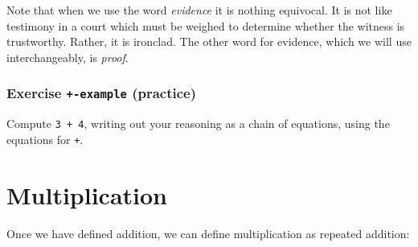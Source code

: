 Note that when we use the word \emph{evidence} it is nothing equivocal.
It is not like testimony in a court which must be weighed to determine
whether the witness is trustworthy. Rather, it is ironclad. The other
word for evidence, which we will use interchangeably, is \emph{proof}.

\hypertarget{Naturals-plus-example}{%
\subsubsection{\texorpdfstring{Exercise \texttt{+-example}
(practice)}{Exercise +-example (practice)}}\label{Naturals-plus-example}}

Compute \texttt{3\ +\ 4}, writing out your reasoning as a chain of
equations, using the equations for \texttt{+}.

\begin{fence}
\begin{code}%
\>[0]\<%
\end{code}
\end{fence}

\hypertarget{multiplication}{%
\section{Multiplication}\label{multiplication}}

Once we have defined addition, we can define multiplication as repeated
addition:

\begin{fence}
\begin{code}%
\>[0]\AgdaOperator{\AgdaFunction{\AgdaUnderscore{}*\AgdaUnderscore{}}}\AgdaSpace{}%
\AgdaSymbol{:}\AgdaSpace{}%
\AgdaSpace{}%
\AgdaSpace{}%
\AgdaSpace{}%
\AgdaSpace{}%
\<%
\\
\>[0]%
\>[8]\AgdaOperator{\AgdaFunction{*}}\AgdaSpace{}%
%
\>[13]\AgdaSymbol{=}%
\>[16]\<%
\\
\>[0]\AgdaSymbol{(}\AgdaSpace{}%
\AgdaSymbol{)}\AgdaSpace{}%
\AgdaOperator{\AgdaFunction{*}}\AgdaSpace{}%
%
\>[13]\AgdaSymbol{=}%
\>[16]\AgdaSpace{}%
\AgdaOperator{\AgdaFunction{+}}\AgdaSpace{}%
\AgdaSymbol{(}\AgdaSpace{}%
\AgdaOperator{\AgdaFunction{*}}\AgdaSpace{}%
\AgdaSymbol{)}\<%
\end{code}
\end{fence}

